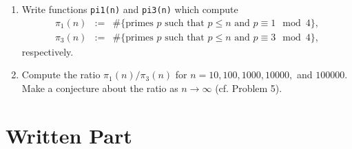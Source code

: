 \documentclass[11pt]{article}
\begin{document}
\begin{enumerate}
{\begin{enumerate}
{    }
    \item{
    Write functions \verb|pi1(n)| and \verb|pi3(n)| which compute
    \begin{eqnarray*}
      \pi_1(n)&:=&\#\{\text{primes }p\text{ such that }p\le n\text{ and }p\equiv 1\mod 4\},\\
      \pi_3(n)&:=&\#\{\text{primes }p\text{ such that }p\le n\text{ and }p\equiv 3\mod 4\},
    \end{eqnarray*}
    respectively.
    }
    \item{
    Compute the ratio $\pi_1(n)/\pi_3(n)$ for $n = 10,100,1000,10000,$ and $100000$.  Make a conjecture about the ratio as $n\to\infty$ (cf. Problem 5).
    }
  \end{enumerate}
  }
\end{enumerate}
\section*{Written Part}
\end{document}
